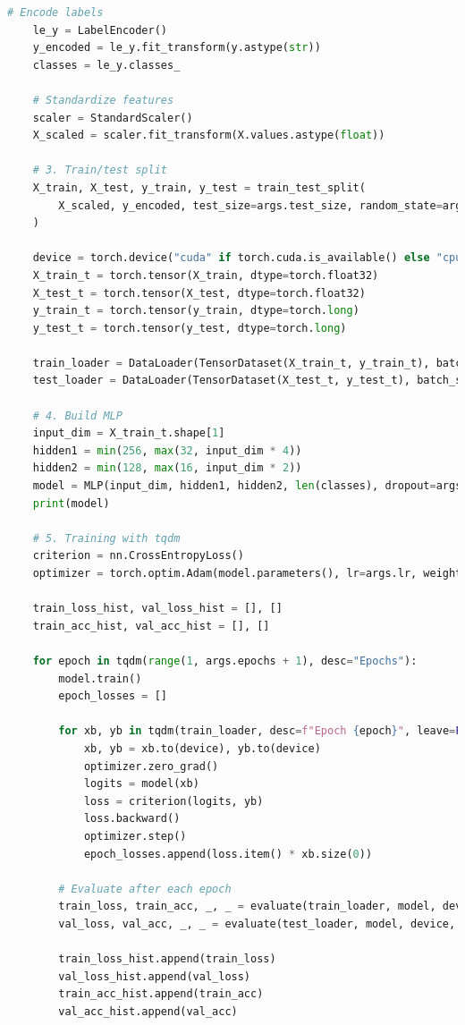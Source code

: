 \documentclass[a4paper]{CPIPC}
\numberwithin{equation}{section}
\begin{document}
\begin{lstlisting}[language=Python, caption=MLP Classifier]
    # Encode labels
    le_y = LabelEncoder()
    y_encoded = le_y.fit_transform(y.astype(str))
    classes = le_y.classes_

    # Standardize features
    scaler = StandardScaler()
    X_scaled = scaler.fit_transform(X.values.astype(float))

    # 3. Train/test split
    X_train, X_test, y_train, y_test = train_test_split(
        X_scaled, y_encoded, test_size=args.test_size, random_state=args.seed, stratify=y_encoded
    )

    device = torch.device("cuda" if torch.cuda.is_available() else "cpu")
    X_train_t = torch.tensor(X_train, dtype=torch.float32)
    X_test_t = torch.tensor(X_test, dtype=torch.float32)
    y_train_t = torch.tensor(y_train, dtype=torch.long)
    y_test_t = torch.tensor(y_test, dtype=torch.long)

    train_loader = DataLoader(TensorDataset(X_train_t, y_train_t), batch_size=args.batch_size, shuffle=True)
    test_loader = DataLoader(TensorDataset(X_test_t, y_test_t), batch_size=256, shuffle=False)

    # 4. Build MLP
    input_dim = X_train_t.shape[1]
    hidden1 = min(256, max(32, input_dim * 4))
    hidden2 = min(128, max(16, input_dim * 2))
    model = MLP(input_dim, hidden1, hidden2, len(classes), dropout=args.dropout).to(device)
    print(model)

    # 5. Training with tqdm
    criterion = nn.CrossEntropyLoss()
    optimizer = torch.optim.Adam(model.parameters(), lr=args.lr, weight_decay=args.weight_decay)

    train_loss_hist, val_loss_hist = [], []
    train_acc_hist, val_acc_hist = [], []

    for epoch in tqdm(range(1, args.epochs + 1), desc="Epochs"):
        model.train()
        epoch_losses = []

        for xb, yb in tqdm(train_loader, desc=f"Epoch {epoch}", leave=False):
            xb, yb = xb.to(device), yb.to(device)
            optimizer.zero_grad()
            logits = model(xb)
            loss = criterion(logits, yb)
            loss.backward()
            optimizer.step()
            epoch_losses.append(loss.item() * xb.size(0))

        # Evaluate after each epoch
        train_loss, train_acc, _, _ = evaluate(train_loader, model, device, criterion)
        val_loss, val_acc, _, _ = evaluate(test_loader, model, device, criterion)

        train_loss_hist.append(train_loss)
        val_loss_hist.append(val_loss)
        train_acc_hist.append(train_acc)
        val_acc_hist.append(val_acc)


\end{lstlisting}
\end{document}
